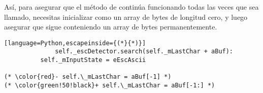 Así, para asegurar que el método  de  continúa funcionando todas las veces que sea llamado, necesitas inicializar  como un array de bytes de longitud cero, y luego asegurar que sigue conteniendo un array de bytes permanentemente.


\begin{lstlisting}[language=Python,escapeinside={(*}{*)}]
              self._escDetector.search(self._mLastChar + aBuf):
          self._mInputState = eEscAscii

(* \color{red}- self.\_mLastChar = aBuf[-1] *)
(* \color{green!50!black}+ self.\_mLastChar = aBuf[-1:] *)
\end{lstlisting}

